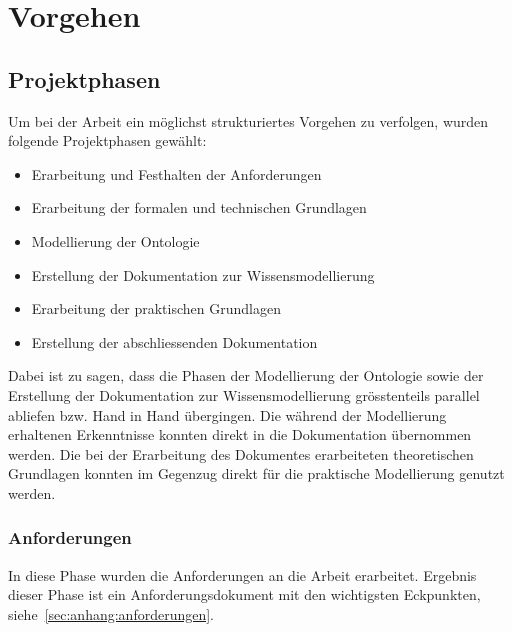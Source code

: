 \chapter{Vorgehen}
\label{chap:vorgehen}

\section{Projektphasen}
\label{sec:projektphasen}

Um bei der Arbeit ein möglichst strukturiertes Vorgehen zu verfolgen, wurden folgende Projektphasen gewählt:
\begin{itemize}
\item Erarbeitung und Festhalten der Anforderungen
\item Erarbeitung der formalen und technischen Grundlagen
\item Modellierung der Ontologie
\item Erstellung der Dokumentation zur Wissensmodellierung
\item Erarbeitung der praktischen Grundlagen
\item Erstellung der abschliessenden Dokumentation
\end{itemize}

Dabei ist zu sagen, dass die Phasen der Modellierung der Ontologie sowie der Erstellung der Dokumentation zur Wissensmodellierung grösstenteils parallel abliefen bzw. Hand in Hand übergingen. Die während der Modellierung erhaltenen Erkenntnisse konnten direkt in die Dokumentation übernommen werden. Die bei der Erarbeitung des Dokumentes erarbeiteten theoretischen Grundlagen konnten im Gegenzug direkt für die praktische Modellierung genutzt werden.

\subsection{Anforderungen}
\label{subsec:anforderungen}
In diese Phase wurden die Anforderungen an die Arbeit erarbeitet. Ergebnis dieser Phase ist ein Anforderungsdokument mit den wichtigsten Eckpunkten, siehe~\autoref{sec:anhang:anforderungen}.

